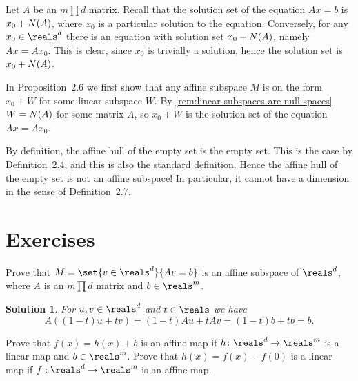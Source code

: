 \documentclass[article, a4paper, 11pt, oneside]{memoir}
\numberwithin{equation}{chapter}
\theoremstyle{nonumberplain}
\newtheorem{solution}{Solution}
\begin{document}
\begin{remarkbreak}
    Let $A$ be an $m \prod d$ matrix. Recall that the solution set of the equation $Ax = b$ is $x_0 + N(A)$, where $x_0$ is a particular solution to the equation. Conversely, for any $x_0 \in \reals^d$ there is an equation with solution set $x_0 + N(A)$, namely $Ax = Ax_0$. This is clear, since $x_0$ is trivially a solution, hence the solution set is $x_0 + N(A)$.

    In Proposition~2.6 we first show that any affine subspace $M$ is on the form $x_0 + W$ for some linear subspace $W$. By \cref{rem:linear-subspaces-are-null-spaces} $W = N(A)$ for some matrix $A$, so $x_0 + W$ is the solution set of the equation $Ax = Ax_0$.
\end{remarkbreak}


\begin{remarkbreak}
    By definition, the affine hull of the empty set is the empty set. This is the case by Definition~2.4, and this is also the standard definition. Hence the affine hull of the empty set is not an affine subspace! In particular, it cannot have a dimension in the sense of Definition~2.7.
\end{remarkbreak}


\section*{Exercises}


\begin{exerciseframed*}[4]
    Prove that $M = \set{v \in \reals^d}{Av = b}$ is an affine subspace of $\reals^d$, where $A$ is an $m \prod d$ matrix and $b \in \reals^m$.
\end{exerciseframed*}

\begin{solution}
    For $u,v \in \reals^d$ and $t \in \reals$ we have
    \begin{equation*}
        A((1-t)u + tv)
            = (1-t)Au + tAv
            = (1-t)b + tb
            = b.
    \end{equation*}
\end{solution}


\begin{exerciseframed*}[9]
    Prove that $f(x) = h(x) + b$ is an affine map if $h \colon \reals^d \to \reals^m$ is a linear map and $b \in \reals^m$. Prove that $h(x) = f(x) - f(0)$ is a linear map if $f : \reals^d \to \reals^m$ is an affine map.
\end{exerciseframed*}
\end{document}
